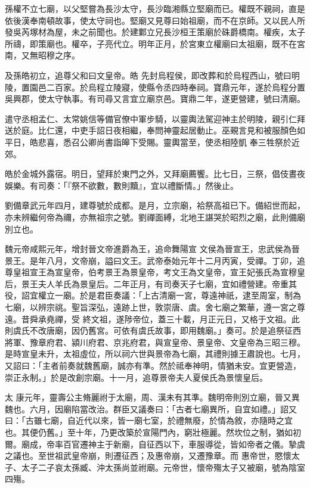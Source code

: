 \begin{pinyinscope}
 孫權不立七廟，以父堅嘗為長沙太守，長沙臨湘縣立堅廟而已。權既不親祠，直是依後漢奉南頓故事，使太守祠也。堅廟又見尊曰始祖廟，而不在京師。又以民人所發吳芮塚材為屋，未之前聞也。於建鄴立兄長沙桓王策廟於硃爵橋南。權疾，太子所禱，即策廟也。權卒，子亮代立。明年正月，於宮東立權廟曰太祖廟，既不在宮南，又無昭穆之序。



 及孫皓初立，追尊父和曰文皇帝。皓
 先封烏程侯，即改葬和於烏程西山，號曰明陵，置園邑二百家。於烏程立陵寢，使縣令丞四時奉祠。寶鼎元年，遂於烏程分置吳興郡，使太守執事。有司尋又言宜立廟京邑。寶鼎二年，遂更營建，號曰清廟。



 遣守丞相孟仁、太常姚信等備官僚中軍步騎，以靈輿法駕迎神主於明陵，親引仁拜送於庭。比仁還，中吏手詔日夜相繼，奉問神靈起居動止。巫覡言見和被服顏色如平日，皓悲喜，悉召公卿尚書詣皞下受賜。靈輿當至，使丞相陸凱
 奉三牲祭於近郊。



 皓於金城外露宿。明日，望拜於東門之外，又拜廟薦饗。比七日，三祭，倡伎晝夜娛樂。有司奏：「『祭不欲數，數則黷』，宜以禮斷情。」然後止。



 劉備章武元年四月，建尊號於成都。是月，立宗廟，袷祭高祖已下。備紹世而起，亦未辨繼何帝為禰，亦無祖宗之號。劉禪面縛，北地王諶哭於昭烈之廟，此則備廟別立也。



 魏元帝咸熙元年，增封晉文帝進爵為王，追命舞陽宣
 文侯為晉宣王，忠武侯為晉景王。是年八月，文帝崩，謚曰文王。武帝泰始元年十二月丙寅，受禪。丁卯，追尊皇祖宣王為宣皇帝，伯考景王為景皇帝，考文王為文皇帝，宣王妃張氏為宣穆皇后，景王夫人羊氏為景皇后。二年正月，有司奏天子七廟，宜如禮營建。帝重其役，詔宜權立一廟。於是君臣奏議：「上古清廟一宮，尊遠神祇，逮至周室，制為七廟，以辨宗祧。聖旨深弘，遠跡上世，敦崇唐、虞。舍七廟之繁華，遵一宮之尊遠。昔舜承堯禪，受
 終文祖，遂陟帝位，蓋三十載，月正元日，又格于文祖。此則虞氏不改唐廟，因仍舊宮。可依有虞氏故事，即用魏廟。」奏可。於是追祭征西將軍、豫章府君、潁川府君、京兆府君，與宣皇帝、景皇帝、文皇帝為三昭三穆。是時宣皇未升，太祖虛位，所以祠六世與景帝為七廟，其禮則據王肅說也。七月，又詔曰：「主者前奏就魏舊廟，誠亦有準。然於祗奉神明，情猶未安。宜更營造，崇正永制。」於是改創宗廟。十一月，追尊景帝夫人夏侯氏為景懷皇后。



 太
 康元年，靈壽公主脩麗祔于太廟，周、漢未有其準。魏明帝則別立廟，晉又異魏也。六月，因廟陷當改治。群臣又議奏曰：「古者七廟異所，自宜如禮。」詔又曰：「古雖七廟，自近代以來，皆一廟七室，於禮無廢，於情為敘，亦隨時之宜也。其便仍舊。」至十年，乃更改築於宣陽門內，窮壯極麗。然坎位之制，猶如初爾。廟成，帝率百官遷神主于新廟，自征西以下，車服導從，皆如帝者之儀。摯虞之議也。至世祖武皇帝崩，則遷征西；及惠帝崩，又遷豫章。而
 惠帝世，愍懷太子、太子二子哀太孫臧、沖太孫尚並祔廟。元帝世，懷帝殤太子又被廟，號為陰室四殤。




\end{pinyinscope}
